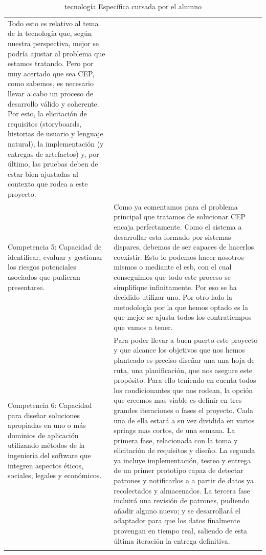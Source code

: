 \documentclass[a4paper]{article}
\begin{document}
\begin{longtable}{m{5.605cm}m{10.849cm}}
{    Todo esto es relativo al tema de la tecnología que, según nuestra perspectiva, mejor se podría ajustar al problema que estamos tratando. Pero por muy acertado que sea CEP, como sabemos, es necesario llevar a cabo un proceso de desarrollo válido y coherente. Por esto, la elicitación de requisitos (storyboards, historias de usuario y lenguaje natural), la implementación (y entregas de artefactos) y, por último, las pruebas deben de estar bien ajustadas al contexto que rodea a este proyecto.}\\
    
    {\color{black} Competencia 5: Capacidad de identificar, evaluar y gestionar los riesgos potenciales asociados que pudieran presentarse.} &
    {\color{black} Como ya comentamos para el problema principal que tratamos de solucionar CEP encaja perfectamente.
      Como el sistema a desarrollar esta formado por sistemas dispares, debemos de ser capaces de hacerlos coexistir. Esto lo podemos hacer nosotros mismos o mediante el esb, con el cual conseguimos que todo este proceso se simplifique infinitamente. Por eso se ha decidido utilizar uno.
      Por otro lado la metodología por la que hemos optado es la que mejor se ajusta todos los contratiempos que vamos a tener.
   	}\\
    
    \rowcolor{gray!30}
    {\color{black} Competencia 6: Capacidad para dise\~nar soluciones apropiadas en uno o m\'as dominios de aplicaci\'on utilizando m\'etodos de la ingenier\'ia del software que integren aspectos \'eticos, sociales, legales y econ\'omicos.} &
    {\color{black} Para poder llevar a buen puerto este proyecto y que alcance los objetivos que nos hemos planteado es preciso diseñar una una hoja de ruta, una planificación, que nos asegure este propósito. Para ello teniendo en cuenta todos los condicionantes que nos rodean, la opción que creemos mas viable es definir en tres grandes iteraciones o fases el proyecto. Cada una de ella estará a su vez dividida en varios springs mas cortos, de una semana. La primera fase, relacionada con la toma y elicitación de requisitos y diseño. La segunda ya incluye implementación, testeo y entrega de un primer prototipo capaz de detectar patrones y notificarlos a a partir de datos ya recolectados y almacenados. La tercera fase incluirá una revisión de patrones, pudiendo añadir alguno nuevo; y se desarrollará el adaptador para que los datos finalmente provengan en tiempo real, saliendo de esta última iteración la entrega definitiva.
    }\\
\caption{tecnolog\'ia Espec\'ifica cursada por el alumno}\label{tab:tablaCompetencias}
\end{longtable}
\bigskip
\end{document}

